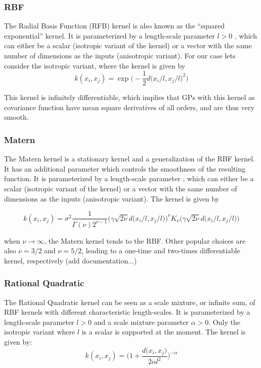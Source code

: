 \documentclass[12pt]{article}
\begin{document}
\subsubsection{RBF}
The Radial Basis Function (RFB) kernel is also known as the “squared exponential” kernel. It is parameterized by a length-scale parameter $l > 0$ , which can either be a scalar (isotropic variant of the kernel) or a vector with the same number of dimensions as the inputs  (anisotropic variant). For our case lets consider the isotropic variant, where the kernel is given by
\begin{equation}
k(x_{i}, x_{j}) = \exp \bigg( -\frac{1}{2} d\big(x_{i}/l, x_{j}/l\big)^{2} \bigg)
\end{equation}

This kernel is infinitely differentiable, which implies that GPs with this kernel as covariance function have mean square derivatives of all orders, and are thus very smooth.

\subsubsection{Matern}
The Matern kernel is a stationary kernel and a generalization of the RBF kernel. It has an additional parameter  which controls the smoothness of the resulting function. It is parameterized by a length-scale parameter , which can either be a scalar (isotropic variant of the kernel) or a vector with the same number of dimensions as the inputs  (anisotropic variant). The kernel is given by

\begin{equation}
k(x_{i}, x_{j}) = \sigma^{2} \frac{1}{\Gamma(\nu)2^{\nu - 1}}
\Bigg(\gamma \sqrt{2\nu} d\big(x_{i}/l, x_{j}/l\big)\Bigg)^{\nu} K_{\nu} \Bigg(\gamma \sqrt{2\nu} d\big(x_{i}/l, x_{j}/l\big)\Bigg)
\end{equation}

when $\nu \rightarrow \infty$, the Matern kernel tends to the RBF. Other popular choices are also $\nu = 3/2$ and $\nu = 5/2$, leading to a one-time and two-times differentiable kernel, respectively (add documentation...)

\subsubsection{Rational Quadratic} 
The Rational Quadratic kernel can be seen as a scale mixture, or infinite sum, of RBF kernels with different characteristic length-scales. It is parameterized by a length-scale parameter $l > 0$ and a scale mixture parameter $\alpha > 0$. Only the isotropic variant where $l$ is a scalar is supported at the moment. The kernel is given by:
\begin{equation}
k(x_{i}, x_{j}) = \Bigg( 1 + \frac{d\big(x_{i}, x_{j}\big)}{2\alpha l^{2}} \Bigg)^{-\alpha}
\end{equation}
\end{document}
